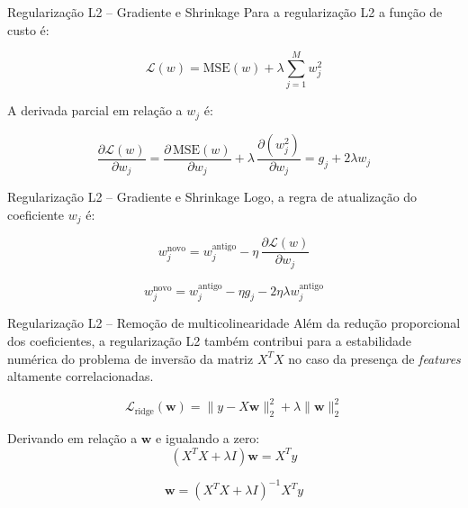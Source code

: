 \documentclass{beamer}
\begin{document}
\begin{frame}{Regularização L2 – Gradiente e Shrinkage}
Para a regularização L2 a função de custo é:

\begin{equation}
\mathcal{L}(w) = \text{MSE}(w) + \lambda \sum_{j=1}^{M} w_j^2
\end{equation}

A derivada parcial em relação a $w_j$ é:

\begin{equation}
\frac{\partial \mathcal{L}(w)}{\partial w_j}
= \frac{\partial \, \text{MSE}(w)}{\partial w_j}
+ \lambda \, \frac{\partial (w_j^2)}{\partial w_j}
= g_j + 2\lambda w_j
\end{equation}

\end{frame}

\begin{frame}{Regularização L2 – Gradiente e Shrinkage}
Logo, a regra de atualização do coeficiente $w_j$ é:

\begin{equation}
w_j^{\text{novo}} = w_j^{\text{antigo}} - \eta \, \frac{\partial \mathcal{L}(w)}{\partial w_j}
\end{equation}

\begin{equation}
w_j^{\text{novo}} = w_j^{\text{antigo}} - \eta g_j - 2\eta\lambda w_j^{\text{antigo}}
\end{equation}
\end{frame}

\begin{frame}{Regularização L2 – Remoção de multicolinearidade}
Além da redução proporcional dos coeficientes, a regularização L2 também contribui para a estabilidade numérica do problema de inversão da matriz $X^TX$ no caso da presença de \textit{features} altamente correlacionadas.


\begin{equation}
\mathcal{L}_{\text{ridge}}(\mathbf{w}) =
\|y - X\mathbf{w}\|_2^2 + \lambda \|\mathbf{w}\|_2^2
\end{equation}

Derivando em relação a $\mathbf{w}$ e igualando a zero:
\begin{equation}
(X^T X + \lambda I)\mathbf{w} = X^T y
\end{equation}

\begin{equation}
    \mathbf{w} = (X^T X + \lambda I)^{-1} X^T y
\end{equation}

\end{frame}
\end{document}
